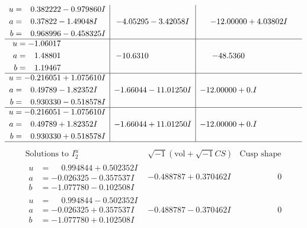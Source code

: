 \documentclass[1p]{elsarticle_modified}
\theoremstyle{definition}
\newcommand{\I}{\sqrt{-1}}
\begin{document}
$$\begin{array}{c|c|c}
\begin{aligned}
u &= \phantom{-}0.382222 - 0.979860 I \\
a &= \phantom{-}0.37822 - 1.49048 I \\
b &= \phantom{-}0.968996 - 0.458325 I\end{aligned}
 & -4.05295 - 3.42058 I & -12.00000 + 4.03802 I \\ \hline\begin{aligned}
u &= -1.06017\phantom{ +0.000000I} \\
a &= \phantom{-}1.48801\phantom{ +0.000000I} \\
b &= \phantom{-}1.19467\phantom{ +0.000000I}\end{aligned}
 & -10.6310\phantom{ +0.000000I} & -48.5360\phantom{ +0.000000I} \\ \hline\begin{aligned}
u &= -0.216051 + 1.075610 I \\
a &= \phantom{-}0.49789 - 1.82352 I \\
b &= \phantom{-}0.930330 - 0.518578 I\end{aligned}
 & -1.66044 - 11.01250 I & -12.00000 + 0. I\phantom{ +0.000000I} \\ \hline\begin{aligned}
u &= -0.216051 - 1.075610 I \\
a &= \phantom{-}0.49789 + 1.82352 I \\
b &= \phantom{-}0.930330 + 0.518578 I\end{aligned}
 & -1.66044 + 11.01250 I & -12.00000 + 0. I\phantom{ +0.000000I}\\
 \hline 
 \end{array}$$\newpage$$\begin{array}{c|c|c}  
\text{Solutions to }I^u_{2}& \I (\text{vol} + \sqrt{-1}CS) & \text{Cusp shape}\\
 \hline 
\begin{aligned}
u &= \phantom{-}0.994844 + 0.502352 I \\
a &= -0.026325 - 0.357537 I \\
b &= -1.077780 - 0.102508 I\end{aligned}
 & -0.488787 + 0.370462 I & \phantom{-0.000000 } 0 \\ \hline\begin{aligned}
u &= \phantom{-}0.994844 - 0.502352 I \\
a &= -0.026325 + 0.357537 I \\
b &= -1.077780 + 0.102508 I\end{aligned}
 & -0.488787 - 0.370462 I & \phantom{-0.000000 } 0 \\ \hline\begin{aligned}

\end{aligned}
\end{array}$$
\end{document}
